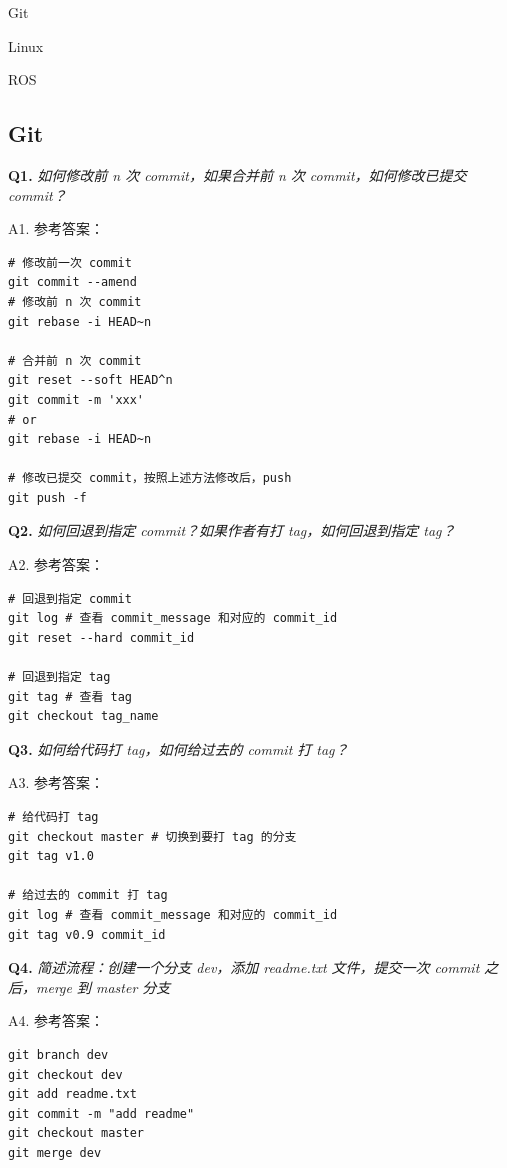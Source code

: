 \documentclass[cn,10pt,math=newtx,citestyle=gb7714-2015,bibstyle=gb7714-2015]{elegantbook}
\begin{document}
\begin{introduction}
\item Git
\item Linux
\item ROS
\end{introduction}

\subsection{Git}

\textbf{Q1.} \textit{如何修改前 n 次 commit，如果合并前 n 次 commit，如何修改已提交 commit？}

A1. 参考答案：

\begin{lstlisting}
# 修改前一次 commit
git commit --amend
# 修改前 n 次 commit
git rebase -i HEAD~n

# 合并前 n 次 commit
git reset --soft HEAD^n
git commit -m 'xxx'
# or
git rebase -i HEAD~n

# 修改已提交 commit，按照上述方法修改后，push
git push -f
\end{lstlisting}

\textbf{Q2.} \textit{如何回退到指定 commit？如果作者有打 tag，如何回退到指定 tag？}

A2. 参考答案：

\begin{lstlisting}
# 回退到指定 commit
git log # 查看 commit_message 和对应的 commit_id
git reset --hard commit_id

# 回退到指定 tag
git tag # 查看 tag
git checkout tag_name
\end{lstlisting}

\textbf{Q3.} \textit{如何给代码打 tag，如何给过去的 commit 打 tag？}

A3. 参考答案：

\begin{lstlisting}
# 给代码打 tag
git checkout master # 切换到要打 tag 的分支
git tag v1.0

# 给过去的 commit 打 tag
git log # 查看 commit_message 和对应的 commit_id
git tag v0.9 commit_id
\end{lstlisting}

\textbf{Q4.} \textit{简述流程：创建一个分支 dev，添加 readme.txt 文件，提交一次 commit 之后，merge 到 master 分支}

A4. 参考答案：

\begin{lstlisting}
git branch dev
git checkout dev
git add readme.txt 
git commit -m "add readme"
git checkout master
git merge dev
\end{lstlisting}
\end{document}
